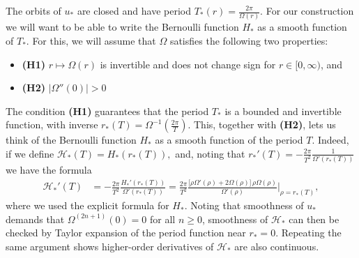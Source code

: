 \documentclass[11pt]{article}
\theoremstyle{plain}
\numberwithin{equation}{section}
\theoremstyle{remark}
\newcommand{\be}{\begin{equation}}
\newcommand{\ee}{\end{equation}}
\begin{document}
The orbits of $u_*$ are closed and have period $T_*(r) = \frac{2\pi}{\Omega(r)}$. For our construction
we will want to be able to write the Bernoulli function $H_*$ as a smooth function
of $T_*$. For this, we will assume that $\Omega$ satisfies the following two properties:
\begin{itemize}
    \item[] \textbf{(H1)} $r \mapsto \Omega(r)$ is invertible and does not change sign for $r \in [0, \infty)$, and
    \item[] \textbf{(H2)} $|\Omega''(0)| > 0$ 
\end{itemize}
The condition \textbf{(H1)} guarantees that the period $T_*$
is a bounded and invertible function, with inverse $r_*(T) = \Omega^{-1}\left(\tfrac{2\pi}{T}\right)$.
This, together with \textbf{(H2)}, lets us think of the Bernoulli
function $H_*$ as a smooth function of the period $T$. Indeed,
if we define
$
  \mathcal{H}_*(T) = H_*(r_*(T)),
$
and, noting that $r_*'(T) = -\frac{2\pi}{T^2}\frac{1}{\Omega'(r_*(T))}$ we have the formula
\begin{align}
  \mathcal{H}_*'(T) &= -\frac{2\pi}{T^2} \frac{H_*'(r_*(T))}{\Omega'(r_*(T))}
= \frac{2\pi}{T^2} \frac{\Big[ \rho \Omega'(\rho)+ 2 \Omega(\rho)\Big]\, \rho \Omega(\rho) }{\Omega'(\rho)}\Bigg|_{\rho=r_*(T)},
\end{align}
where we used the explicit formula for $H_*$. Noting that smoothness of $u_*$ demands that  $\Omega^{(2n+1)}(0)=0$ for all $n\geq 0$, smoothness of $\mathcal{H}_*$ can then be checked by Taylor expansion of the period function near $r_*=0$.
Repeating the same argument shows higher-order
derivatives of $\mathcal{H}_*$ are also continuous. 
\end{document}
